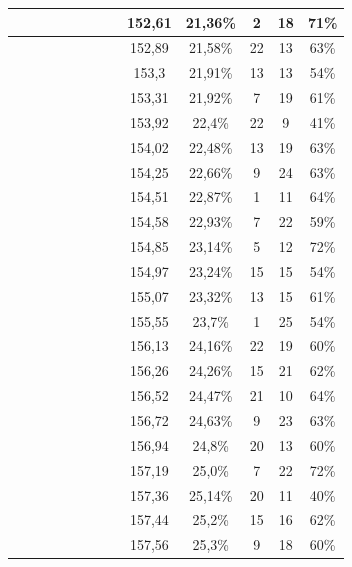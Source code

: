 \begin{center}
\begin{longtable}{|c|c|c|c|c|c|c|c|c|c|c|c|c|}
 \x &  \x &  &  &  \x &  \x &  \x &  \x & 152,61 & 21,36\% & 2 & 18 & 71\% \\ \hline
 \x &  \x &  \x &  &  \x &  &  \x &  \x & 152,89 & 21,58\% & 22 & 13 & 63\% \\ \hline
 \x &  \x &  &  &  &  &  \x &  \x & 153,3 & 21,91\% & 13 & 13 & 54\% \\ \hline
 \x &  \x &  &  &  \x &  &  \x &  \x & 153,31 & 21,92\% & 7 & 19 & 61\% \\ \hline
 \x &  &  &  &  &  &  \x &  \x & 153,92 & 22,4\% & 22 & 9 & 41\% \\ \hline
 \x &  &  \x &  \x &  &  &  &  \x & 154,02 & 22,48\% & 13 & 19 & 63\% \\ \hline
 \x &  \x &  \x &  \x &  \x &  &  &  \x & 154,25 & 22,66\% & 9 & 24 & 63\% \\ \hline
 \x &  \x &  \x &  &  \x &  &  \x &  \x & 154,51 & 22,87\% & 1 & 11 & 64\% \\ \hline
 \x &  &  &  &  \x &  &  \x &  \x & 154,58 & 22,93\% & 7 & 22 & 59\% \\ \hline
 \x &  \x &  &  &  &  \x &  \x &  \x & 154,85 & 23,14\% & 5 & 12 & 72\% \\ \hline
 \x &  \x &  &  \x &  &  &  \x &  \x & 154,97 & 23,24\% & 15 & 15 & 54\% \\ \hline
 \x &  \x &  &  \x &  \x &  &  \x &  \x & 155,07 & 23,32\% & 13 & 15 & 61\% \\ \hline
 \x &  \x &  &  \x &  &  &  \x &  \x & 155,55 & 23,7\% & 1 & 25 & 54\% \\ \hline
 \x &  &  &  &  \x &  &  \x &  \x & 156,13 & 24,16\% & 22 & 19 & 60\% \\ \hline
 \x &  \x &  \x &  \x &  \x &  &  &  \x & 156,26 & 24,26\% & 15 & 21 & 62\% \\ \hline
 \x &  &  \x &  \x &  &  &  \x &  \x & 156,52 & 24,47\% & 21 & 10 & 64\% \\ \hline
 \x &  &  \x &  \x &  \x &  &  \x &  \x & 156,72 & 24,63\% & 9 & 23 & 63\% \\ \hline
 \x &  \x &  &  \x &  \x &  &  &  \x & 156,94 & 24,8\% & 20 & 13 & 60\% \\ \hline
 \x &  &  \x &  &  &  \x &  \x &  \x & 157,19 & 25,0\% & 7 & 22 & 72\% \\ \hline
 \x &  &  &  &  &  &  \x &  \x & 157,36 & 25,14\% & 20 & 11 & 40\% \\ \hline
 \x &  &  \x &  \x &  \x &  &  &  \x & 157,44 & 25,2\% & 15 & 16 & 62\% \\ \hline
 \x &  \x &  &  &  \x &  &  \x &  \x & 157,56 & 25,3\% & 9 & 18 & 60\% \\ \hline

\end{longtable}
\end{center}
